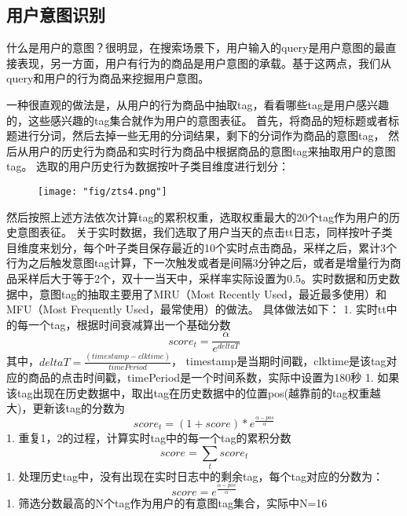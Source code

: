 \subsection{用户意图识别}
什么是用户的意图？很明显，在搜索场景下，用户输入的query是用户意图的最直接表现，另一方面，用户有行为的商品是用户意图的承载。基于这两点，我们从query和用户的行为商品来挖掘用户意图。
\par 一种很直观的做法是，从用户的行为商品中抽取tag，看看哪些tag是用户感兴趣的，这些感兴趣的tag集合就作为用户的意图表征。
首先，将商品的短标题或者标题进行分词，然后去掉一些无用的分词结果，剩下的分词作为商品的意图tag， 然后从用户的历史行为商品和实时行为商品中根据商品的意图tag来抽取用户的意图tag。
选取的用户历史行为数据按叶子类目维度进行划分：
\begin{figure}[!h]
	\centering
	\texttt{[image: "fig/zts4.png"]}
	\caption{}
	\label{fig:zts4}
\end{figure}


然后按照上述方法依次计算tag的累积权重，选取权重最大的20个tag作为用户的历史意图表征。
关于实时数据，我们选取了用户当天的点击tt日志，同样按叶子类目维度来划分，每个叶子类目保存最近的10个实时点击商品，采样之后，累计3个行为之后触发意图tag计算，下一次触发或者是间隔3分钟之后，或者是增量行为商品采样后大于等于2个，双十一当天中，采样率实际设置为0.5。实时数据和历史数据中，意图tag的抽取主要用了MRU（Most Recently Used，最近最多使用）和MFU（Most Frequently Used，最常使用）的做法。
具体做法如下：
 1. 实时tt中的每一个tag，根据时间衰减算出一个基础分数
\begin{equation}
score_t = \frac{\alpha}{e^{deltaT}}
\end{equation} 
其中，$deltaT = \frac{(timestamp - clktime)}{timePeriod}$，
timestamp是当期时间戳，clktime是该tag对应的商品的点击时间戳，timePeriod是一个时间系数，实际中设置为180秒
 1. 如果该tag出现在历史数据中，取出tag在历史数据中的位置pos(越靠前的tag权重越大)，更新该tag的分数为
\begin{equation} 
score_t = {(1 + score)} * {e^{\frac{\alpha - pos}{\alpha}}}
\end{equation} 
 1. 重复1，2的过程，计算实时tag中的每一个tag的累积分数
\begin{equation} 
score =  \sum_{t}{score_t}
\end{equation} 
 1. 处理历史tag中，没有出现在实时日志中的剩余tag，每个tag对应的分数为：
\begin{equation} 
score = e^{\frac{\alpha - pos}{\alpha}}
\end{equation} 
 1. 筛选分数最高的N个tag作为用户的有意图tag集合，实际中N=16


